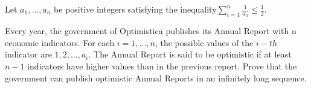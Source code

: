 Let $a_1, . . . , a_n$ be positive integers satisfying the inequality$\sum_{i=1}^{n}\frac{1}{a_n}\le \frac{1}{2}$.

Every year, the government of Optimistica publishes its Annual Report with n economic indicators. For each $i = 1, . . . , n$, the possible values of the $i-th$ indicator are $1, 2, . . . , a_i$. The Annual Report is said to be optimistic if at least $n - 1$ indicators have higher values than in the previous report. Prove that the government can publish optimistic Annual Reports in an infinitely long sequence.